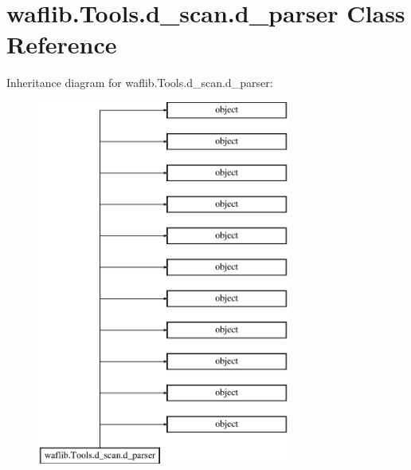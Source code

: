 \hypertarget{classwaflib_1_1_tools_1_1d__scan_1_1d__parser}{}\section{waflib.\+Tools.\+d\+\_\+scan.\+d\+\_\+parser Class Reference}
\label{classwaflib_1_1_tools_1_1d__scan_1_1d__parser}
Inheritance diagram for waflib.\+Tools.\+d\+\_\+scan.\+d\+\_\+parser\+:\begin{figure}[H]
\begin{center}
\leavevmode
\includegraphics[height=12.000000cm]{classwaflib_1_1_tools_1_1d__scan_1_1d__parser}
\end{center}
\end{figure}

